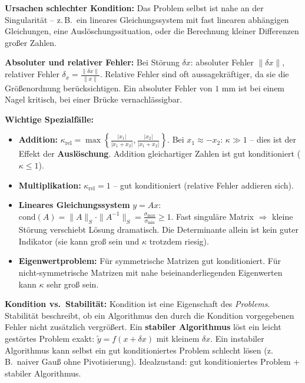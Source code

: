 \textbf{Ursachen schlechter Kondition:} Das Problem selbst ist nahe an der Singularität -- z.\,B.\ ein lineares Gleichungssystem mit fast linearen abhängigen Gleichungen, eine Auslöschungssituation, oder die Berechnung kleiner Differenzen großer Zahlen.

\textbf{Absoluter und relativer Fehler:} Bei Störung $\delta x$: absoluter Fehler $\|\delta x\|$, relativer Fehler $\delta_x = \frac{\|\delta x\|}{\|x\|}$. Relative Fehler sind oft aussagekräftiger, da sie die Größenordnung berücksichtigen. Ein absoluter Fehler von $1$ mm ist bei einem Nagel kritisch, bei einer Brücke vernachlässigbar.


\textbf{Wichtige Spezialfälle:}
\begin{itemize}[leftmargin=1.5em]
    \item \textbf{Addition:} $\kappa_\mathrm{rel} = \max\!\left\{\frac{|x_1|}{|x_1+x_2|}, \frac{|x_2|}{|x_1+x_2|}\right\}$. Bei $x_1 \approx -x_2$: $\kappa \gg 1$ -- dies ist der Effekt der \textbf{Auslöschung}. Addition gleichartiger Zahlen ist gut konditioniert ($\kappa \leq 1$).
    \item \textbf{Multiplikation:} $\kappa_\mathrm{rel} = 1$ -- gut konditioniert (relative Fehler addieren sich).
    \item \textbf{Lineares Gleichungssystem} $y=Ax$: $\mathrm{cond}(A) = \|A\|_S \cdot \|A^{-1}\|_S = \frac{\sigma_{\max}}{\sigma_{\min}} \geq 1$. Fast singuläre Matrix $\Rightarrow$ kleine Störung verschiebt Lösung dramatisch. Die Determinante allein ist kein guter Indikator (sie kann groß sein und $\kappa$ trotzdem riesig).
    \item \textbf{Eigenwertproblem:} Für symmetrische Matrizen gut konditioniert. Für nicht-symmetrische Matrizen mit nahe beieinanderliegenden Eigenwerten kann $\kappa$ sehr groß sein.
\end{itemize}

\textbf{Kondition vs.\ Stabilität:} Kondition ist eine Eigenschaft des \emph{Problems}. Stabilität beschreibt, ob ein Algorithmus den durch die Kondition vorgegebenen Fehler nicht zusätzlich vergrößert. Ein \textbf{stabiler Algorithmus} löst ein leicht gestörtes Problem exakt: $\tilde{y} = f(x + \delta x)$ mit kleinem $\delta x$. Ein instabiler Algorithmus kann selbst ein gut konditioniertes Problem schlecht lösen (z.\,B.\ naiver Gauß ohne Pivotisierung). Idealzustand: gut konditioniertes Problem + stabiler Algorithmus.

